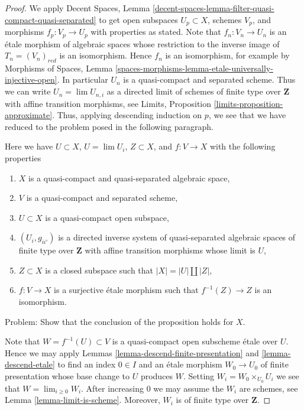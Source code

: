 \documentclass{stacks-project}
\theoremstyle{plain}
\theoremstyle{definition}
\theoremstyle{remark}
\numberwithin{equation}{subsection}
\def\lim{\mathop{\mathrm{lim}}\nolimits}
\begin{document}
\begin{proof}
We apply Decent Spaces, Lemma
\ref{decent-spaces-lemma-filter-quasi-compact-quasi-separated}
to get open subspaces $U_p \subset X$, schemes $V_p$, and morphisms
$f_p : V_p \to U_p$ with properties as stated. Note that
$f_n : V_n \to U_n$ is an \'etale morphism of algebraic spaces
whose restriction to the inverse image of $T_n = (V_n)_{red}$ is an
isomorphism. Hence $f_n$ is an isomorphism, for example by
Morphisms of Spaces, Lemma
\ref{spaces-morphisms-lemma-etale-universally-injective-open}.
In particular $U_n$ is a quasi-compact and separated scheme.
Thus we can write $U_n = \lim U_{n, i}$ as a directed limit
of schemes of finite type over $\mathbf{Z}$ with affine transition
morphisms, see Limits, Proposition \ref{limits-proposition-approximate}.
Thus, applying descending induction on $p$, we see that we have reduced
to the problem posed in the following paragraph.

\medskip\noindent
Here we have $U \subset X$, $U = \lim U_i$, $Z \subset X$, and
$f : V \to X$ with the following properties
\begin{enumerate}
\item $X$ is a quasi-compact and quasi-separated algebraic space,
\item $V$ is a quasi-compact and separated scheme,
\item $U \subset X$ is a quasi-compact open subspace,
\item $(U_i, g_{ii'})$ is a directed inverse system of
quasi-separated algebraic spaces
of finite type over $\mathbf{Z}$ with affine transition morphisms
whose limit is $U$,
\item $Z \subset X$ is a closed subspace such that $|X| = |U| \amalg |Z|$,
\item $f : V \to X$ is a surjective \'etale morphism such that
$f^{-1}(Z) \to Z$ is an isomorphism.
\end{enumerate}
Problem: Show that the conclusion of the proposition holds for $X$.

\medskip\noindent
Note that $W = f^{-1}(U) \subset V$ is a quasi-compact open subscheme
\'etale over $U$. Hence we may apply
Lemmas \ref{lemma-descend-finite-presentation} and \ref{lemma-descend-etale}
to find an index $0 \in I$ and an \'etale morphism $W_0 \to U_0$
of finite presentation whose base change to $U$ produces $W$. Setting
$W_i = W_0 \times_{U_0} U_i$ we see that $W = \lim_{i \geq 0} W_i$. After
increasing $0$ we may assume the $W_i$ are schemes, see
Lemma \ref{lemma-limit-is-scheme}.
Moreover, $W_i$ is of finite type over $\mathbf{Z}$.


\end{proof}
\end{document}

